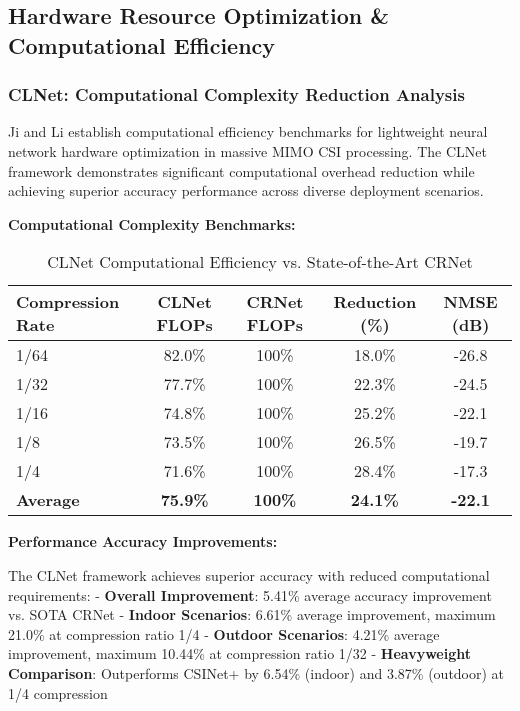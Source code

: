 \documentclass[journal]{IEEEtran}
\begin{document}
{\subsection{Hardware Resource Optimization \& Computational Efficiency}

\subsubsection{CLNet: Computational Complexity Reduction Analysis}

Ji and Li \cite{ji2021clnet} establish computational efficiency benchmarks for lightweight neural network hardware optimization in massive MIMO CSI processing. The CLNet framework demonstrates significant computational overhead reduction while achieving superior accuracy performance across diverse deployment scenarios.

\textbf{Computational Complexity Benchmarks:}

\begin{table}[h]
\centering
\begin{tabular}{|l|c|c|c|c|}
\hline
\textbf{Compression Rate} & \textbf{CLNet FLOPs} & \textbf{CRNet FLOPs} & \textbf{Reduction (\%)} & \textbf{NMSE (dB)} \\
\hline
1/64 & 82.0\% & 100\% & 18.0\% & -26.8 \\
1/32 & 77.7\% & 100\% & 22.3\% & -24.5 \\
1/16 & 74.8\% & 100\% & 25.2\% & -22.1 \\
1/8 & 73.5\% & 100\% & 26.5\% & -19.7 \\
1/4 & 71.6\% & 100\% & 28.4\% & -17.3 \\
\textbf{Average} & \textbf{75.9\%} & \textbf{100\%} & \textbf{24.1\%} & \textbf{-22.1} \\
\hline
\end{tabular}
\caption{CLNet Computational Efficiency vs. State-of-the-Art CRNet}
\label{tab:clnet_efficiency}
\end{table}

\textbf{Performance Accuracy Improvements:}

The CLNet framework achieves superior accuracy with reduced computational requirements:
- \textbf{Overall Improvement}: 5.41\% average accuracy improvement vs. SOTA CRNet
- \textbf{Indoor Scenarios}: 6.61\% average improvement, maximum 21.0\% at compression ratio 1/4
- \textbf{Outdoor Scenarios}: 4.21\% average improvement, maximum 10.44\% at compression ratio 1/32
- \textbf{Heavyweight Comparison}: Outperforms CSINet+ by 6.54\% (indoor) and 3.87\% (outdoor) at 1/4 compression

}
\end{document}
